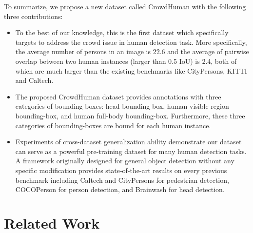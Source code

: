 \documentclass[10pt,twocolumn,letterpaper]{article}
\begin{document}
To summarize, we propose a new dataset called CrowdHuman with the following three contributions:
\begin{itemize}
    \item To the best of our knowledge, this is the first dataset which specifically targets to address the crowd issue in human detection task. More specifically, the average number of persons in an image is $22.6$ and the average of pairwise overlap between two human instances (larger than 0.5 IoU) is 2.4, both of which are much larger than the existing benchmarks like CityPersons, KITTI and Caltech. 
    \item The proposed CrowdHuman dataset provides annotations with three categories of bounding boxes: head bounding-box, human visible-region bounding-box, and human full-body bounding-box. Furthermore, these three categories of bounding-boxes are bound for each human instance.
    \item Experiments of cross-dataset generalization ability demonstrate our dataset can serve as a powerful pre-training dataset for many human detection tasks. A framework originally designed for general object detection without any specific modification provides state-of-the-art results on every previous benchmark including Caltech and CityPersons for pedestrian detection, COCOPerson for person detection, and Brainwash for head detection.
\end{itemize}





\section{Related Work}
\end{document}
